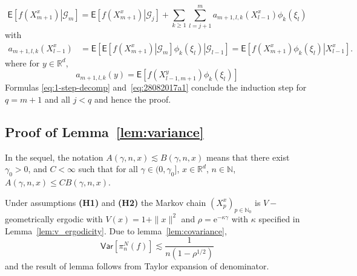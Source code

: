 \documentclass[bj]{imsart}
\def\PVar{\mathsf{Var}}
\def\nset{\mathbb{N}}
\def\rset{\mathbb{R}}
\def\rme{\mathrm{e}}
\def\rset{\mathbb{R}}
\begin{document}
\begin{equation}\label{eq:28082017a1}
\mathsf{E}\left[\left.f(X^x_{m+1})\right| \mathcal{G}_m \right]=\mathsf{E}\left[\left.f(X^x_{m+1})\right| \mathcal{G}_j \right]+\sum_{k\geq1}\sum_{l=j+1}^{m}a_{m+1,l,k}(X^x_{l-1})\phi_{k}(\xi_{l})
\end{equation}
with
\begin{align*}
a_{m+1,l,k}(X^x_{l-1}) &= \mathsf{E}\left[\left.\mathsf{E}\left[\left.f(X^x_{m+1})\right|\mathcal{G}_{m}\right]\phi_{k}(\xi_{l})\right|\mathcal{G}_{l-1}\right]
 = \mathsf{E}\left[\left.f(X^x_{m+1})\phi_{k}(\xi_{l})\right|X^x_{l-1}\right].
\end{align*}
where for $y \in \rset^d$,
\[
a_{m+1,l,k}(y) = \mathsf{E}\left[f(X^y_{l-1,m+1})\phi_{k}(\xi_{l})\right]
\]
Formulas \eqref{eq:1-step-decomp}
and~\eqref{eq:28082017a1} conclude the induction step for $q = m+1$ and all $j < q$ and hence the proof.


\subsection{Proof of Lemma~\ref{lem:variance}}
In the sequel, the notation $A(\gamma,n,x) \lesssim B(\gamma,n,x)$ means that there exist $\gamma_0 > 0$, and $C < \infty$ such that for all  $\gamma \in (0,\gamma_0]$, $x \in \rset^d$, $n \in \nset$, $A(\gamma,n,x) \leq C B(\gamma,n,x)$.

Under assumptions {\bf (H1)} and {\bf (H2)} the Markov chain $(X^x_{p})_{p \in \nset_0}$ is $V-$geometrically ergodic with $V(x) = 1+\|x\|^2$ and $\rho = \rme^{-\kappa\gamma}$ with $\kappa$ specified in Lemma~\ref{lem:v_ergodicity}. Due to lemma~\ref{lem:covariance},
\[
\PVar[\pi_n^N(f)]\lesssim \frac{1}{n(1-\rho^{1/2})}
\]
and the result of lemma follows from Taylor expansion of denominator.
\end{document}
